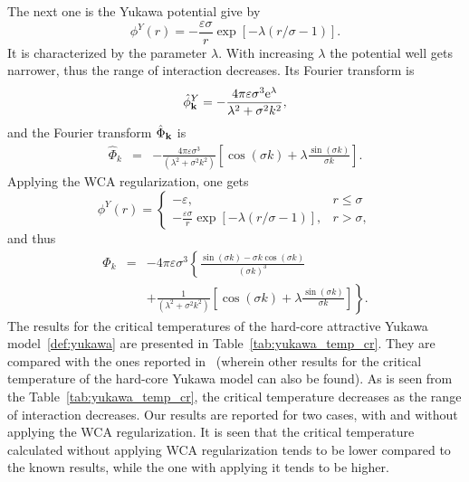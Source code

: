 The next one is the Yukawa potential give by 
\begin{equation}
	\label{def:yukawa}
	\phi^Y(r) = -\frac{\varepsilon \sigma}{r} \exp[-\lambda(r/\sigma - 1)].
\end{equation}
It is characterized by the parameter $\lambda$. With increasing $\lambda$ the potential well gets narrower, thus the range of interaction decreases.
Its Fourier transform is
\begin{equation*}
	\hat{\phi}^Y_{\vb k} = -\frac{4\pi \varepsilon \sigma^3 {\rm e}^{\lambda}}{\lambda^2 + \sigma^2 k^2},
\end{equation*}
and the Fourier transform $\hat{\Phi}_{\vb k}$ is
\begin{eqnarray*}
	\label{eq:part_yukawa_fourier}
	\hat{\Phi}_k & = & -\frac{4\pi \varepsilon\sigma^3}{(\lambda^2 + \sigma^2 k^2)}
	\left[\cos(\sigma k) + \lambda \frac{\sin(\sigma k)}{\sigma k} \right].
\end{eqnarray*}
Applying the WCA regularization, one gets
\begin{equation}
	\label{def:yukawa_wca}
	\phi^Y(r) = \left\{
	\begin{array}{ll}
		-\varepsilon, & r \leq \sigma 
		\\
		-\frac{\varepsilon \sigma}{r} \exp[-\lambda(r/\sigma - 1)], & r > \sigma,
	\end{array}
	\right.
\end{equation}
and thus
\begin{eqnarray*}
	\label{eq:wca_yukawa_fourier}
	\hat{\Phi}_k & = & -4\pi \varepsilon\sigma^3 \left\{ 
	\frac{\sin(\sigma k) - \sigma k \cos(\sigma k)}{(\sigma k)^3}
	\right.
	\\
	&& \left. +\frac{1}{(\lambda^2 + \sigma^2 k^2)}
	\left[\cos(\sigma k) + \lambda \frac{\sin(\sigma k)}{\sigma k} \right]
	\right\}.
\end{eqnarray*}
The results for the critical temperatures of the hard-core attractive Yukawa model~\eqref{def:yukawa} are presented in Table~\ref{tab:yukawa_temp_cr}. They are compared with the ones reported in~\cite{MendoubWaxJakse2010} (wherein other results for the critical temperature of the hard-core Yukawa model can also be found). As is seen from the Table~\ref{tab:yukawa_temp_cr}, the critical temperature decreases as the range of interaction decreases. Our results are reported for two cases, with and without applying the WCA regularization. It is seen that the critical temperature calculated without applying WCA regularization tends to be lower compared to the known results, while the one with applying it tends to be higher.

